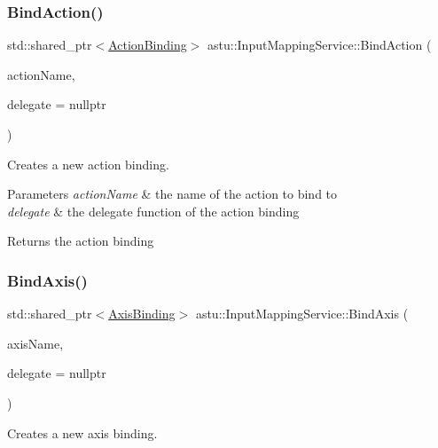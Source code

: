 \subsubsection{\texorpdfstring{Bind\+Action()}{BindAction()}}
{\footnotesize\ttfamily std\+::shared\+\_\+ptr$<$\hyperlink{classastu_1_1ActionBinding}{Action\+Binding}$>$ astu\+::\+Input\+Mapping\+Service\+::\+Bind\+Action (\begin{DoxyParamCaption}\item[{const std\+::string \&}]{action\+Name,  }\item[{\hyperlink{classastu_1_1ActionBinding_ab0e27e5c54f264cb2aa36f65ead9e4ae}{Action\+Binding\+::\+Delegate}}]{delegate = {\ttfamily nullptr} }\end{DoxyParamCaption})}

Creates a new action binding.


\begin{DoxyParams}{Parameters}
{\em action\+Name} & the name of the action to bind to \\
\hline
{\em delegate} & the delegate function of the action binding \\
\hline
\end{DoxyParams}
\begin{DoxyReturn}{Returns}
the action binding 
\end{DoxyReturn}
\mbox{\label{classastu_1_1InputMappingService_a749a68156e22418458ef0b36a6c6911b}} 
\subsubsection{\texorpdfstring{Bind\+Axis()}{BindAxis()}}
{\footnotesize\ttfamily std\+::shared\+\_\+ptr$<$\hyperlink{classastu_1_1AxisBinding}{Axis\+Binding}$>$ astu\+::\+Input\+Mapping\+Service\+::\+Bind\+Axis (\begin{DoxyParamCaption}\item[{const std\+::string \&}]{axis\+Name,  }\item[{\hyperlink{classastu_1_1AxisBinding_a38f398d407de503bd52019e244fa9687}{Axis\+Binding\+::\+Delegate}}]{delegate = {\ttfamily nullptr} }\end{DoxyParamCaption})}

Creates a new axis binding.


